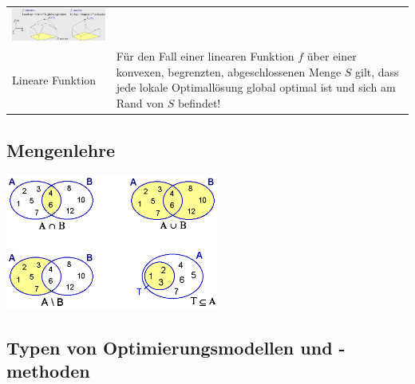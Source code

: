 \begin{tabularx}{\textwidth}{p{6cm} X}
      \includegraphics[width=8cm]{./Content/OptMathModels/ConvexBorderSolution}
      \\
    Lineare Funktion
      & Für den Fall einer linearen Funktion $f$ über einer konvexen, begrenzten, abgeschlossenen Menge $S$ gilt, dass jede lokale Optimallösung global optimal ist und sich am Rand von $S$ befindet!\\
  \end{tabularx}
  
\subsection{Mengenlehre}  

\includegraphics[width=7cm]{./Content/OptMathModels/Mengenlehre}

  
\subsection{Typen von Optimierungsmodellen und -methoden }

